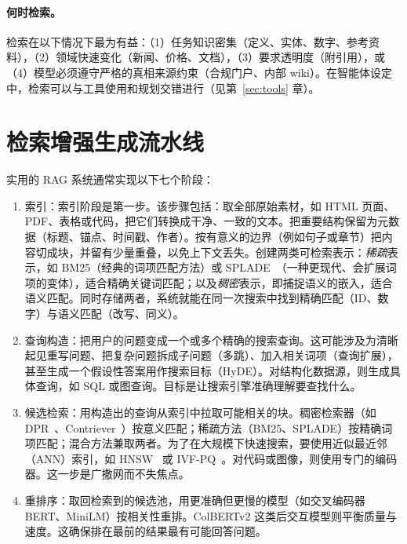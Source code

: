 \paragraph{何时检索。} 检索在以下情况下最为有益：（1）任务知识密集（定义、实体、数字、参考资料），（2）领域快速变化（新闻、价格、文档），（3）要求透明度（附引用），或（4）模型必须遵守严格的真相来源约束（合规门户、内部 wiki）。在智能体设定中，检索可以与工具使用和规划交错进行（见第~\ref{sec:tools} 章）。

\section{检索增强生成流水线}
\label{sec:rag-pipeline}

实用的 RAG 系统通常实现以下七个阶段：
\begin{enumerate}
\item 索引：索引阶段是第一步。该步骤包括：取全部原始素材，如 HTML 页面、PDF、表格或代码，把它们转换成干净、一致的文本。把重要结构保留为元数据（标题、锚点、时间戳、作者）。按有意义的边界（例如句子或章节）把内容切成块，并留有少量重叠，以免上下文丢失。创建两类可检索表示：\emph{稀疏}表示，如 BM25（经典的词项匹配方法）或 SPLADE~\citep{formal2021splade}（一种更现代、会扩展词项的变体），适合精确关键词匹配；以及\emph{稠密}表示，即捕捉语义的嵌入，适合语义匹配。同时存储两者，系统就能在同一次搜索中找到精确匹配（ID、数字）与语义匹配（改写、同义）。

\item 查询构造：把用户的问题变成一个或多个精确的搜索查询。这可能涉及为清晰起见重写问题、把复杂问题拆成子问题（多跳）、加入相关词项（查询扩展），甚至生成一个假设性答案用作搜索目标（HyDE）\citep{gao2023hyde}。对结构化数据源，则生成具体查询，如 SQL 或图查询。目标是让搜索引擎准确理解要查找什么。

\item 候选检索：用构造出的查询从索引中拉取可能相关的块。稠密检索器（如 DPR~\citep{karpukhin2020dense}、Contriever~\citep{izacard2022contriever}）按意义匹配；稀疏方法（BM25、SPLADE）按精确词项匹配；混合方法兼取两者。为了在大规模下快速搜索，要使用近似最近邻（ANN）索引，如 HNSW~\citep{malkov2018HNSWG} 或 IVF-PQ~\citep{herve2011PQNNS}。对代码或图像，则使用专门的编码器。这一步是广撒网而不失焦点。

\item 重排序：取回检索到的候选池，用更准确但更慢的模型（如交叉编码器 BERT、MiniLM）按相关性重排。ColBERTv2 \citep{santhanam2022colbertv2} 这类后交互模型则平衡质量与速度。这确保排在最前的结果最有可能回答问题。


\end{enumerate}
